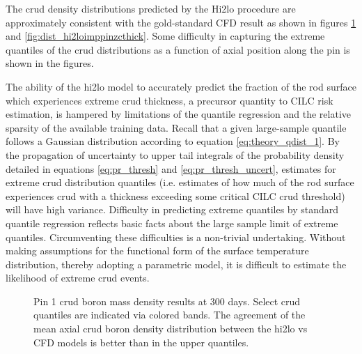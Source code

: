 The crud density distributions predicted by the Hi2lo procedure are approximately consistent with the gold-standard CFD result as shown in figures \ref{fig:dist_hi2loimppinzbmass} and \ref{fig:dist_hi2loimppinzcthick}. Some difficulty in capturing the extreme quantiles of the crud distributions as a function of axial position along the pin is shown in the figures. 

The ability of the hi2lo model to accurately predict the fraction of the rod surface which experiences extreme crud thickness, a precursor quantity to CILC risk estimation, is hampered by limitations of the quantile regression and the relative sparsity of the available training data.  Recall that a given large-sample quantile follows a Gaussian distribution according to equation \ref{eq:theory_qdist_1}. By the propagation of uncertainty to upper tail integrals of the probability density detailed in equations \ref{eq:pr_thresh} and \ref{eq:pr_thresh_uncert}, estimates for extreme crud distribution quantiles (i.e. estimates of how much of the rod surface experiences crud with a thickness exceeding some critical CILC crud threshold) will have high variance.  Difficulty in predicting extreme quantiles by standard quantile regression reflects basic facts about the large sample limit of extreme quantiles.
Circumventing these difficulties is a non-trivial undertaking.  Without making assumptions for the functional form of the surface temperature distribution, thereby adopting a parametric model, it is difficult to estimate the likelihood of extreme crud events.

\begin{figure}[H]%
    \centering
    \hspace*{-1.0em}%
    \caption[Pin 1 crud boron mass density results at 300 days]{Pin 1 crud boron mass density results at 300 days.  Select crud quantiles are indicated via colored bands.  The agreement of the mean axial crud boron density distribution between the hi2lo vs CFD models is better than in the upper quantiles. }%
    \label{fig:dist_hi2loimppinzbmass}
\end{figure}


